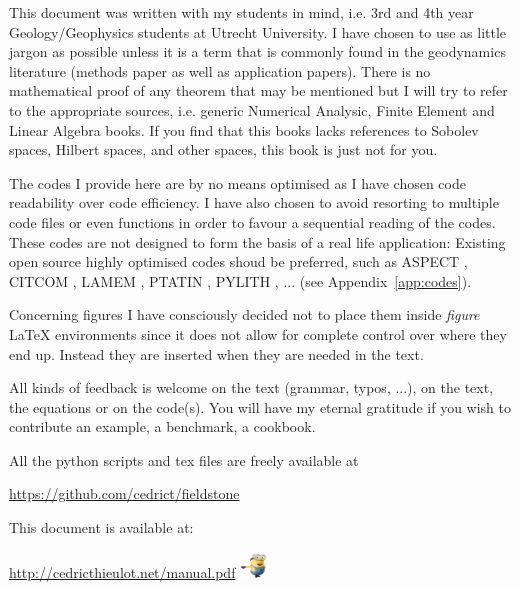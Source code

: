 
This document was written with my students in mind, i.e. 3rd and 4th year 
Geology/Geophysics students at Utrecht University. 
I have chosen to use as little jargon as possible unless it is a term that is 
commonly found in the geodynamics literature (methods paper as well as 
application papers). There is no mathematical proof of any theorem that may 
be mentioned but I will try to refer to the appropriate sources, i.e.
generic Numerical Analysic, Finite Element and 
Linear Algebra books. If you find that this books lacks references
to Sobolev spaces, Hilbert spaces, and other spaces, this book is just not for you.  

The codes I provide here are by no means optimised as I have chosen code readability 
over code efficiency. I have also chosen to avoid resorting to multiple code 
files or even functions in order to favour a sequential reading of the codes. 
These codes are not designed to form the basis of a real life application:
Existing open source highly optimised codes shoud be preferred, such as 
ASPECT \cite{krhb12,hedg17}, CITCOM \cite{zhzm00,zhmt08}, LAMEM \cite{kapb16}, 
PTATIN \cite{mabl14,mabl15}, PYLITH \cite{aakw13}, ... (see Appendix~\ref{app:codes}).

Concerning figures I have consciously decided not to place them inside {\sl figure} \LaTeX 
environments since it does not allow for complete control over where they end up. 
Instead they are inserted when they are needed in the text. 

All kinds of feedback is welcome on the text (grammar, typos, ...), on the text, the equations
or on the code(s). You will have my eternal gratitude if you wish to contribute an 
example, a benchmark, a cookbook. 

All the python scripts and tex files are freely available at 
\begin{center}
\url{https://github.com/cedrict/fieldstone}
\end{center}
This document is available at:
\begin{center}
\url{http://cedricthieulot.net/manual.pdf}  \includegraphics[width=0.7cm]{images/minion}
\end{center}

